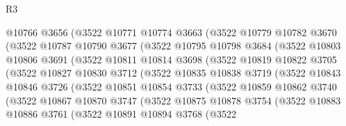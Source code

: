 \begin{lexlean}{R3}
\begin{coremodule}
                @10766
                @3656
                (@3522
                  @10771
                  @10774
                  @3663
                  (@3522
                    @10779
                    @10782
                    @3670
                    (@3522
                      @10787
                      @10790
                      @3677
                      (@3522
                        @10795
                        @10798
                        @3684
                        (@3522
                          @10803
                          @10806
                          @3691
                          (@3522
                            @10811
                            @10814
                            @3698
                            (@3522
                              @10819
                              @10822
                              @3705
                              (@3522
                                @10827
                                @10830
                                @3712
                                (@3522
                                  @10835
                                  @10838
                                  @3719
                                  (@3522
                                    @10843
                                    @10846
                                    @3726
                                    (@3522
                                      @10851
                                      @10854
                                      @3733
                                      (@3522
                                        @10859
                                        @10862
                                        @3740
                                        (@3522
                                          @10867
                                          @10870
                                          @3747
                                          (@3522
                                            @10875
                                            @10878
                                            @3754
                                            (@3522
                                              @10883
                                              @10886
                                              @3761
                                              (@3522
                                                @10891
                                                @10894
                                                @3768
                                                (@3522

\end{coremodule}
\end{lexlean}
